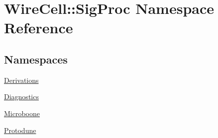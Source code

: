 \hypertarget{namespace_wire_cell_1_1_sig_proc}{}\section{Wire\+Cell\+:\+:Sig\+Proc Namespace Reference}
\label{namespace_wire_cell_1_1_sig_proc}
\subsection*{Namespaces}
\begin{DoxyCompactItemize}
\item 
 \hyperlink{namespace_wire_cell_1_1_sig_proc_1_1_derivations}{Derivations}
\item 
 \hyperlink{namespace_wire_cell_1_1_sig_proc_1_1_diagnostics}{Diagnostics}
\item 
 \hyperlink{namespace_wire_cell_1_1_sig_proc_1_1_microboone}{Microboone}
\item 
 \hyperlink{namespace_wire_cell_1_1_sig_proc_1_1_protodune}{Protodune}
\end{DoxyCompactItemize}
